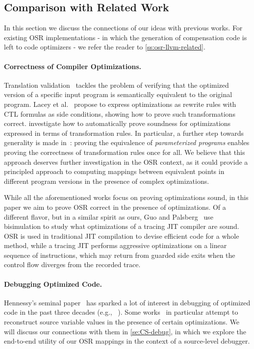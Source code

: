 \subsection{Comparison with Related Work}
In this section we discuss the connections of our ideas with previous works. For existing OSR implementations - in which the generation of compensation code is left to code optimizers - we refer the reader to \mysection\ref{ss:osr-llvm-related}.

\paragraph*{Correctness of Compiler Optimizations.} Translation validation~\cite{Pnueli98, Necula00} tackles the problem of verifying that the optimized version of a specific input program is semantically equivalent to the original program. Lacey et al.~\cite{Lacey02, Lacey04} propose to express optimizations as rewrite rules with CTL formulas as side conditions, showing how to prove such transformations correct. \cite{Lerner03, Lerner05, Kundu09} investigate how to automatically prove soundness for optimizations expressed in terms of transformation rules. In particular, a further step towards generality is made in~\cite{Kundu09}: proving the equivalence of {\em parameterized programs} enables proving the correctness of transformation rules once for all. We believe that this approach deserves further investigation in the OSR context, as it could provide a principled approach to computing mappings between equivalent points in different program versions in the presence of complex optimizations. 

While all the aforementioned works focus on proving optimizations sound, in this paper we aim to prove OSR correct in the presence of optimizations. Of a different flavor, but in a similar spirit as ours, Guo and Palsberg~\cite{Guo11} use bisimulation to study what optimizations of a tracing JIT compiler are sound. OSR is used in traditional JIT compilation to devise efficient code for a whole method, while a tracing JIT performs aggressive optimizations on a linear sequence of instructions, which may return from guarded side exits when the control flow diverges from the recorded trace.

\paragraph*{Debugging Optimized Code.} Hennessy's seminal paper~\cite{Hennessy82} has sparked a lot of interest in debugging of optimized code in the past three decades (e.g., ~\cite{Coutant88, Adl-Tabatabai96, Wu99, Jaramillo00, Barr14}). Some works~\cite{Hennessy82, Wu99} in particular attempt to reconstruct source variable values in the presence of certain optimizations. We will discuss our connections with them in \mysection\ref{se:CS-debug}, in which we explore the end-to-end utility of our OSR mappings in the context of a source-level debugger.

